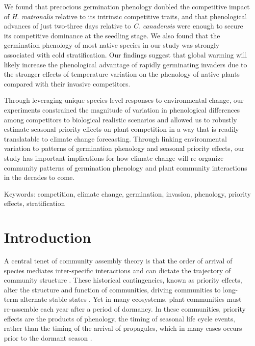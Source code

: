 \documentclass{article}[11pt]
\begin{document}
We found that precocious germination phenology doubled the competitive impact of \textit{H. matronalis} relative to its intrinsic competitive traits, and that phenological advances of just two-three days relative to \textit{C. canadensis} were enough to secure its competitive dominance at the seedling stage. We also found that the germination phenology of most native species in our study was strongly associated with cold stratification. Our findings suggest that global warming will likely increase the phenological advantage of rapidly germinating invaders due to the stronger effects of temperature variation on the phenology of native plants compared with their invasive competitors.

Through leveraging unique species-level responses to environmental change, our experiments constrained the magnitude of variation in phenological differences among competitors to biological realistic scenarios and allowed us to robustly estimate seasonal priority effects on plant competition in a way that is readily translatable to climate change forecasting. Through linking environmental variation to patterns of germination phenology and seasonal priority effects, our study has important implications for how climate change will re-organize community patterns of germination phenology and plant community interactions in the decades to come.


Keywords: competition, climate change, germination, invasion, phenology, priority effects, stratification

\pagebreak
\section*{Introduction}
 A central tenet of community assembly theory is that the order of arrival of species mediates inter-specific interactions and can dictate the trajectory of community structure \citep{Fukami2015}. These historical contingencies, known as priority effects, alter the structure and function of communities, driving communities to long-term alternate stable states \citep{Fukami2011}. Yet in many ecosystems, plant communities must re-assemble each year after a period of dormancy. In these communities, priority effects are the products of phenology, the timing of seasonal life cycle events, %
rather than the timing of the arrival of propagules, which in many cases occurs prior to the dormant season \citep{Rudolf:2019aa,Howe:1982aa,Baskin:1988aa}. 
\end{document}
